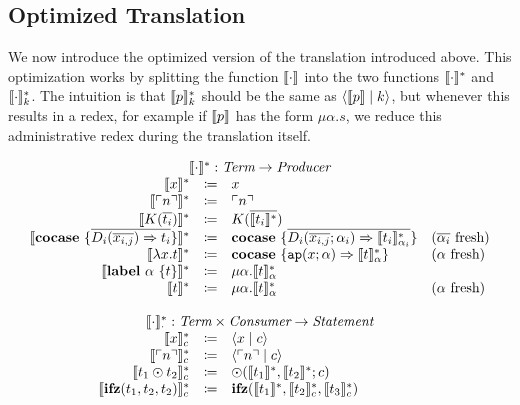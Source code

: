 \subsection{Optimized Translation}
\label{subsec:translation:optimized}
We now introduce the optimized version of the translation introduced above.
This optimization works by splitting the function $\llbracket \cdot \rrbracket$ into the two functions $\llbracket \cdot \rrbracket_{}^{\ast}$ and $\llbracket \cdot \rrbracket_{k}^{\ast}$.
The intuition is that $\llbracket p \rrbracket_{k}^{\ast}$ should be the same as $\langle \llbracket p \rrbracket \mid k \rangle$, but whenever this results in a redex, for example if $\llbracket p \rrbracket$ has the form $\mu \alpha.s$, we reduce this administrative redex during the translation itself.

\[
  \begin{array}{rcll}
    \multicolumn{4}{c}{\translatestar{\cdot}{} : \emph{Term} \rightarrow  \emph{Producer}}\\
    \translatestar{x}{} & \coloneqq & x & \\
    \translatestar{\lit{n}}{} & \coloneqq & \lit{n} & \\
    \translatestar{K(\overline{t_i})}{} & \coloneqq & K(\overline{\translatestar{t_i}{}}) & \\
    \translatestar{\cocase{\overline{D_i(\overline{x_{i,j}}) \Rightarrow t_i}}}{} & \coloneq & \cocase{\overline{D_i(\overline{x_{i,j}}; \alpha_i) \Rightarrow \translatestar{t_i}{\alpha_i}}} & \fresh{\overline{\alpha_i}} \\
    \translatestar{\lambda x.t}{} & \coloneq & \cocase{\mathtt{ap}(x; \alpha) \Rightarrow \translatestar{t}{\alpha}} & \fresh{\alpha} \\
    \translatestar{\lab{\alpha}{t}}{} & \coloneq & \mu \alpha.\translatestar{t}{\alpha}{} & \\
    \translatestar{t}{} & \coloneqq & \mu\alpha.\translatestar{t}{\alpha} & \fresh{\alpha}\\
    \\
    \multicolumn{4}{c}{\translatestar{\cdot}{\cdot} : \emph{Term} \times \emph{Consumer} \rightarrow \emph{Statement}}\\
    \translatestar{x}{c} & \coloneq & \cut{x}{c} & \\
    \translatestar{\lit{n}}{c} & \coloneq & \cut{\lit{n}}{c} & \\
    \translatestar{t_1 \odot t_2}{c} & \coloneq & \odot(\translatestar{t_1}{}, \translatestar{t_2}{}; c) & \\
    \translatestar{\ifz{t_1}{t_2}{t_2}}{c} & \coloneq & \ifz{\translatestar{t_1}{}}{\translatestar{t_2}{c}}{\translatestar{t_3}{c}} & \\

\end{array}\]
